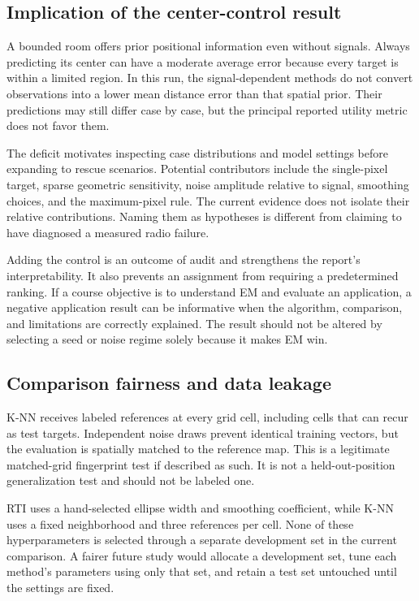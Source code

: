 \documentclass[conference,letterpaper]{IEEEtran}
\begin{document}
\subsection{Implication of the center-control result}
A bounded room offers prior positional information even without signals. Always predicting its center can have a moderate average error because every target is within a limited region. In this run, the signal-dependent methods do not convert observations into a lower mean distance error than that spatial prior. Their predictions may still differ case by case, but the principal reported utility metric does not favor them.

The deficit motivates inspecting case distributions and model settings before expanding to rescue scenarios. Potential contributors include the single-pixel target, sparse geometric sensitivity, noise amplitude relative to signal, smoothing choices, and the maximum-pixel rule. The current evidence does not isolate their relative contributions. Naming them as hypotheses is different from claiming to have diagnosed a measured radio failure.

Adding the control is an outcome of audit and strengthens the report's interpretability. It also prevents an assignment from requiring a predetermined ranking. If a course objective is to understand EM and evaluate an application, a negative application result can be informative when the algorithm, comparison, and limitations are correctly explained. The result should not be altered by selecting a seed or noise regime solely because it makes EM win.

\subsection{Comparison fairness and data leakage}
K-NN receives labeled references at every grid cell, including cells that can recur as test targets. Independent noise draws prevent identical training vectors, but the evaluation is spatially matched to the reference map. This is a legitimate matched-grid fingerprint test if described as such. It is not a held-out-position generalization test and should not be labeled one.

RTI uses a hand-selected ellipse width and smoothing coefficient, while K-NN uses a fixed neighborhood and three references per cell. None of these hyperparameters is selected through a separate development set in the current comparison. A fairer future study would allocate a development set, tune each method's parameters using only that set, and retain a test set untouched until the settings are fixed.
\end{document}
